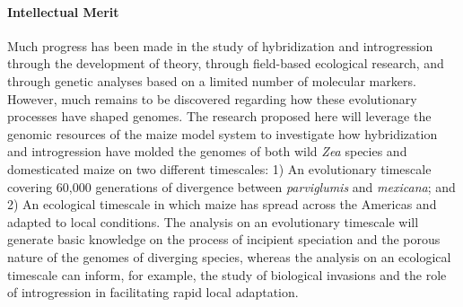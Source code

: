 %

\paragraph{Intellectual Merit}  Much progress has been made in the study of hybridization and introgression through the development of theory, through field-based ecological research, and through genetic analyses based on a limited number of molecular markers. However, much remains to be discovered regarding how these evolutionary processes have shaped genomes. The research proposed here will leverage the genomic resources of the maize model system to investigate how hybridization and introgression have molded the genomes of both wild \emph{Zea} species and domesticated maize on two different timescales: 1) An evolutionary timescale covering 60,000 generations of divergence between \emph{parviglumis} and \emph{mexicana}; and 2) An ecological timescale in which maize has spread across the Americas and adapted to local conditions. The analysis on an evolutionary timescale will generate basic knowledge on the process of incipient speciation and the porous nature of the genomes of diverging species, whereas the analysis on an ecological timescale can inform, for example, the study of biological invasions and the role of introgression in facilitating rapid local adaptation.




